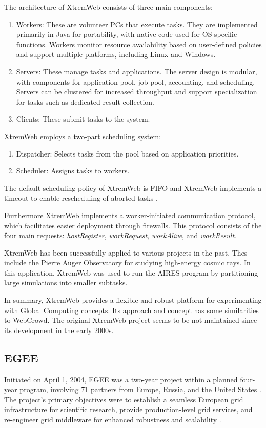 The architecture of XtremWeb consists of three main components:
\begin{enumerate}
  \item Workers: These are volunteer PCs that execute tasks. They are implemented primarily in Java for portability, with native code used for OS-specific functions. Workers monitor resource availability based on user-defined policies and support multiple platforms, including Linux and Windows.
  \item Servers: These manage tasks and applications. The server design is modular, with components for application pool, job pool, accounting, and scheduling. Servers can be clustered for increased throughput and support specialization for tasks such as dedicated result collection.
  \item Clients: These submit tasks to the system.
\end{enumerate}
XtremWeb employs a two-part scheduling system:
\begin{enumerate}
  \item Dispatcher: Selects tasks from the pool based on application priorities.
  \item Scheduler: Assigns tasks to workers.
\end{enumerate}
The default scheduling policy of XtremWeb is FIFO and XtremWeb implements a timeout to enable rescheduling of aborted tasks \cite{relatedwork:xtremweb}.

Furthermore XtremWeb implements a worker-initiated communication protocol, which facilitates easier deployment through firewalls. This protocol consists of the four main requests: \emph{hostRegister}, \emph{workRequest}, \emph{workAlive}, and \emph{workResult}. \cite{relatedwork:xtremweb}

XtremWeb has been successfully applied to various projects in the past. Thes include the Pierre Auger Observatory for studying high-energy cosmic rays. In this application, XtremWeb was used to run the \ac{AIRES} program by partitioning large simulations into smaller subtasks. \cite{relatedwork:xtremweb}

In summary, XtremWeb provides a flexible and robust platform for experimenting with Global Computing concepts. Its approach and concept has some similarities to WebCrowd. The original XtremWeb project seems to be not maintained since its development in the early 2000s.

\subsection{EGEE}
\label{subsec:background:related_work:egee}
Initiated on April 1, 2004, \ac{EGEE} was a two-year project within a planned four-year program, involving 71 partners from Europe, Russia, and the United States \cite{relatedwork:egee}. The project's primary objectives were to establish a seamless European grid infrastructure for scientific research, provide production-level grid services, and re-engineer grid middleware for enhanced robustness and scalability \cite{relatedwork:egee}.

